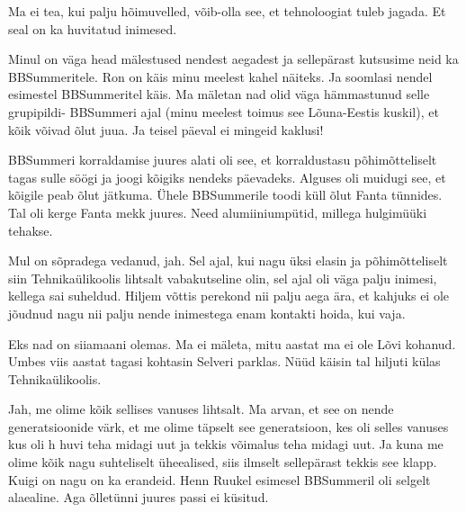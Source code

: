 
Ma ei tea, kui palju hõimuvelled, võib-olla see, et tehnoloogiat tuleb jagada. Et seal on ka huvitatud inimesed. 

Minul on väga head mälestused nendest aegadest ja sellepärast kutsusime neid ka  BBSummeritele. Ron on käis minu meelest kahel näiteks. Ja soomlasi nendel esimestel BBSummeritel käis. Ma mäletan nad olid väga hämmastunud selle grupipildi- BBSummeri ajal (minu meelest toimus see Lõuna-Eestis kuskil),  et kõik võivad õlut juua. Ja teisel päeval ei mingeid kaklusi!

BBSummeri korraldamise juures alati oli see, et korraldustasu  põhimõtteliselt tagas sulle söögi ja joogi kõigiks nendeks päevadeks. Alguses oli muidugi see, et kõigile peab õlut jätkuma. Ühele BBSummerile toodi küll õlut Fanta tünnides. Tal oli kerge Fanta mekk juures. Need alumiiniumpütid, millega hulgimüüki tehakse. 


Mul on sõpradega vedanud, jah. Sel ajal, kui  nagu üksi elasin ja põhimõtteliselt siin Tehnikaülikoolis lihtsalt vabakutseline olin, sel ajal oli väga palju inimesi, kellega sai suheldud. Hiljem võttis perekond nii palju aega ära, et kahjuks ei ole jõudnud nagu nii palju nende inimestega enam kontakti hoida, kui vaja.


Eks nad on siiamaani olemas. Ma ei mäleta, mitu aastat ma ei ole Lõvi kohanud. Umbes viis aastat tagasi kohtasin Selveri parklas. Nüüd käisin tal hiljuti külas Tehnikaülikoolis.


Jah, me olime kõik sellises vanuses lihtsalt. Ma arvan, et see on nende generatsioonide värk, et me olime täpselt see generatsioon, kes  oli selles vanuses kus oli h huvi teha midagi uut ja tekkis võimalus teha midagi uut. Ja kuna me olime kõik nagu suhteliselt üheealised, siis ilmselt  sellepärast tekkis see klapp. Kuigi on nagu on  ka erandeid. Henn Ruukel esimesel BBSummeril oli selgelt alaealine. Aga õlletünni juures passi ei küsitud.

